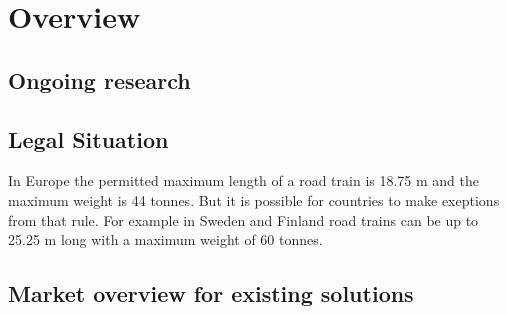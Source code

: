 \documentclass[ExampleMasters.tex]{subfiles}
\begin{document}
\clearpage
\chapter{Overview}
\label{chap:overview}
\section{Ongoing research}
\label{sec:ongoing_research}
\section{Legal Situation}
\label{sec:legal_situation}
In Europe the permitted maximum length of a road train is 18.75 m and the maximum weight is 44 tonnes. But it is possible for countries to make exeptions from that rule.\cite{96/53/EC}  For example in Sweden and Finland road trains can be up to 25.25 m long with a  maximum weight of 60 tonnes.\cite{Vägverket}
\section{Market overview for existing solutions}
\label{sec:market_overview}
\end{document}
